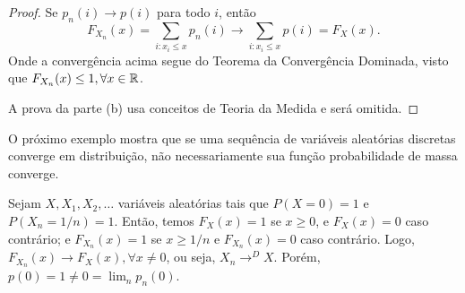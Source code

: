 \begin{frame}
%
%
\begin{proof}
Se $p_n(i)\rightarrow p(i)$ para todo $i$, então
$$F_{X_n}(x)=\sum_{i:x_i\leq x} p_n(i)\rightarrow \sum_{i:x_i\leq x} p(i)=F_X(x).$$
Onde a convergência acima segue do Teorema da Convergência Dominada, visto que $F_{X_n}(x)\leq 1,\forall x\in \mathbb{R}$.

A prova da parte (b) usa conceitos de Teoria da Medida e será omitida.
\end{proof}
%
%
%
%
%
O próximo exemplo mostra que se uma sequência de variáveis aleatórias discretas converge em distribuição, não necessariamente sua função probabilidade de massa converge.
%
\begin{exem}
Sejam $X,X_1,X_2,\ldots$ variáveis aleatórias tais que $P(X=0)=1$ e $P(X_n=1/n)=1$. Então, temos $F_X(x)=1$ se $x\geq 0$, e $F_X(x)=0$ caso contrário; e $F_{X_n}(x)=1$ se $x\geq 1/n$ e $F_{X_n}(x)=0$ caso contrário. Logo, $F_{X_n}(x)\rightarrow F_X(x),\forall x\ne 0$, ou seja, $X_n\rightarrow^D X$. Porém, $p(0)=1\ne 0=\lim_n p_n(0)$.
\end{exem}
%
\end{frame}
%
